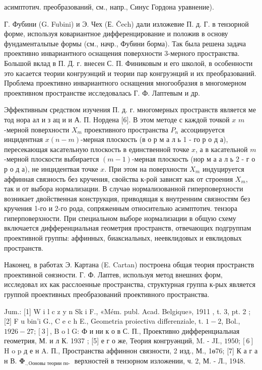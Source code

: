 \documentclass[10pt]{article}
\begin{document}
асимптотич. преобразований, см., напр., Синус Гордона уравнение).



Г. Фубини (G. Fubini) и Э. Чех (Е. Čech) дали изложевие П. д. Г. в тензорной форме, используя ковариантное дифференцирование и положив в основу фундаментальпые формы (см., начр., Фубини борма). Так была решена задача проективно инвариантного оснащения поверхности 3-мерного пространства. Большой вклад в П. Д. г. внесен С. П. Финиковым и его школой, в особенности это касается теории конгруэнций и теории пар конгруэнций и их преобразований. Проблема проективно инвариантного оснащения многообразия в многомерном проективном пространстве исследовалась Г. Ф. Лаптевым и др.



Эффективным средством изучения П. д. г. многомерных пространств является ме тод нора ал и з ац и и А. П. Нордена [6]. В этом методе с каждой точкой $x$ $m$-мерной поверхности $X_{m}$ проективного пространства $P_{n}$ ассоциируется инцидентная $x(n-m)$-мерная плоскость (в о р м а л ь 1 - го р о д а), пересекающая касательную плоскость в единственной точке $x$, а в касательной $m$-мерной плоскости выбирается $(m-1)$-мерная плоскость (нор м а а л ь 2 - г о р о д а), не инцидентвая точке $x$. При этом на поверхности $X_{m}$ индуцируется аффинная связность без кручения, свойства к-рой зависят как от строения $X_{m}$, так и от выбора нормализации. В случаө нормализованной гиперповерхности возникает двойственная конструкция, приводящая к внутренним связностям без кручения 1-го и 2-го рода, сопряженным относительно асимптотич. тензора гиперповерхности. При специальном выборе нормализации в общую схему включается дифференциальная геометрия пространств, отвечающих подгруппам проективной группы: аффинных, биаксиальных, неевклидовых и евклидовых пространств.



Наконец, в работах Э. Картана (E. Cartan) построена общая теория пространств проективной сөязности. Г. Ф. Лаптев, используя метод внешних форм, исследовал их как расслоенные пространства, структурная группа к-рых является группой проективных преобразований проективного пространства.



Jum.: [1] W i l c z y n Sk i F., «Mém. publ. Acad. Belgique», 1911 , t. 3, pt. 2 ; [2] F u bin'i G., C e c h E., Geometria proiectiva differenziale, t. $1-2$, Bol., $1926-27 ;[3]$, B o l G: Ф и ни к о в С. П., Проективно дифференциальная геометрия, М. и л К. 1937 ; [5] е г о же, Теория конгруәнций, M. - JI., $1950 ;[6]$ H o p д е н A. П., Пространства аффиннон связности, 2 изд., М., 1ө76; [7] К а г а н В. $\boldsymbol{\Phi}_{., \text {Ооновы теории по- }}$ верхностей в тензорном изложении, ч. 2, М. - Л., 1948.
\end{document}
